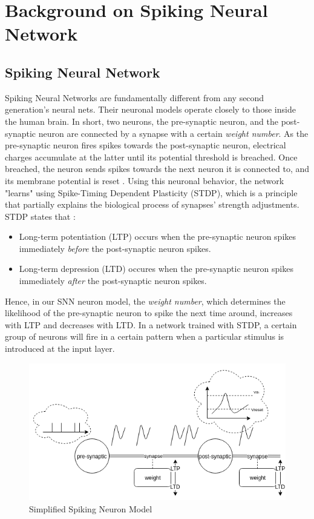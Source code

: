 \documentclass[11pt]{article}  %
\begin{document}
\section{Background on Spiking Neural Network}
\label{bg_snn}

\subsection{Spiking Neural Network}

Spiking Neural Networks are fundamentally different from any second generation's neural nets. Their neuronal models operate closely to those inside the human brain. In short, two neurons, the pre-synaptic neuron, and the post-synaptic neuron are connected by a synapse with a certain \textit{weight number}. As the pre-synaptic neuron fires spikes towards the post-synaptic neuron, electrical charges accumulate at the latter until its potential threshold is breached. Once breached, the neuron sends spikes towards the next neuron it is connected to, and its membrane potential is reset \cite{b3}. Using this neuronal behavior, the network "learns" using Spike-Timing Dependent Plasticity (STDP), which is a principle that partially explains the biological process of synapses' strength adjustments. STDP states that \cite{b4}:

\begin{itemize}
	\item Long-term potentiation (LTP) occurs when the pre-synaptic neuron spikes immediately \textit{before} the post-synaptic neuron spikes.
	\item Long-term depression (LTD) occures when the pre-synaptic neuron spikes immediately \textit{after} the post-synaptic neuron spikes.
\end{itemize}

Hence, in our SNN neuron model, the \textit{weight number}, which determines the likelihood of the pre-synaptic neuron to spike the next time around, increases with LTP and decreases with LTD. In a network trained with STDP, a certain group of neurons will fire in a certain pattern when a particular stimulus is introduced at the input layer. 

\begin{figure}[!htb]
	\centering
	\includegraphics[width=0.6\linewidth]{"neuron model"}
	\caption{Simplified Spiking Neuron Model}
	\label{fig:neuron-model}
\end{figure}
\end{document}
